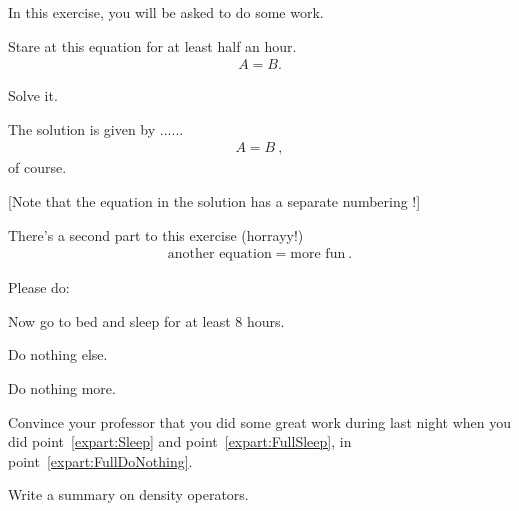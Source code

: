 \documentclass[11pt,a4paper]{article}
\begin{document}
\MakeUebungHeader



In this exercise, you will be asked to do some work.


\begin{exenumerate}
\item Stare at this equation for at least half an hour.
  \begin{align}
    A = B.
  \end{align}

\item Solve it.

  \begin{loesung}
    The solution is given by ...... 
    \begin{align}
      A=B\ ,
    \end{align}
    of course.

    [Note that the equation in the solution has a separate numbering !]
  \end{loesung}
\end{exenumerate}

There's a second part to this exercise (horrayy!)
\begin{align}
  \text{another equation} = \text{more fun}\ .
\end{align}


\begin{exenumerate} %
\item {}
  Please do:
  \begin{exenumerate}
  \item \label{expart:Sleep}
    Now go to bed and sleep for at least 8 hours.
  \item {}
    Do nothing else.
  \item Do nothing more.
  \end{exenumerate}

\item Convince your professor that you did some great work during last night when you did
  point~\ref{expart:Sleep} and point~\ref{expart:FullSleep}, in
  point~\ref{expart:FullDoNothing}.

\item Write a summary on density operators.

\end{exenumerate}
\end{document}
